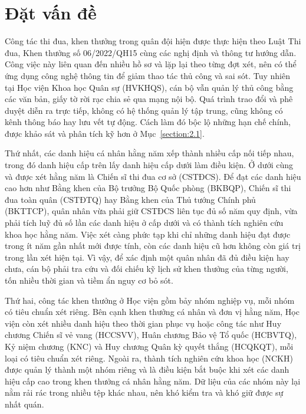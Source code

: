\documentclass[../DoAn.tex]{subfiles}
\begin{document}
\section{Đặt vấn đề}
\label{section:1.1}

Công tác thi đua, khen thưởng trong quân đội hiện được thực hiện theo Luật Thi đua, Khen thưởng số 06/2022/QH15 \cite{luat062022} cùng các nghị định và thông tư hướng dẫn.
Công việc này liên quan đến nhiều hồ sơ và lặp lại theo từng đợt xét, nên có thể ứng dụng công nghệ thông tin để giảm thao tác thủ công và sai sót. Tuy nhiên tại Học viện Khoa học Quân sự (HVKHQS), cán bộ vẫn quản lý thủ công bằng các văn bản, giấy tờ rời rạc chia sẻ qua mạng nội bộ.
Quá trình trao đổi và phê duyệt diễn ra trực tiếp, không có hệ thống quản lý tập trung, cũng không có kênh thông báo hay lưu vết tự động.
Cách làm đó bộc lộ những hạn chế chính, được khảo sát và phân tích kỹ hơn ở Mục~\ref{section:2.1}.

Thứ nhất, các danh hiệu cá nhân hằng năm xếp thành nhiều cấp nối tiếp nhau, trong đó danh hiệu cấp trên lấy danh hiệu cấp dưới làm điều kiện.
Ở dưới cùng và được xét hằng năm là Chiến sĩ thi đua cơ sở (CSTĐCS).
Để đạt các danh hiệu cao hơn như Bằng khen của Bộ trưởng Bộ Quốc phòng (BKBQP), Chiến sĩ thi đua toàn quân (CSTĐTQ) hay Bằng khen của Thủ tướng Chính phủ (BKTTCP), quân nhân vừa phải giữ CSTĐCS liên tục đủ số năm quy định, vừa phải tích luỹ đủ số lần các danh hiệu ở cấp dưới và có thành tích nghiên cứu khoa học hằng năm.
Việc xét càng phức tạp khi chỉ những danh hiệu đạt được trong ít năm gần nhất mới được tính, còn các danh hiệu cũ hơn không còn giá trị trong lần xét hiện tại.
Vì vậy, để xác định một quân nhân đã đủ điều kiện hay chưa, cán bộ phải tra cứu và đối chiếu kỹ lịch sử khen thưởng của từng người, tốn nhiều thời gian và tiềm ẩn nguy cơ bỏ sót.

Thứ hai, công tác khen thưởng ở Học viện gồm bảy nhóm nghiệp vụ, mỗi nhóm có tiêu chuẩn xét riêng.
Bên cạnh khen thưởng cá nhân và đơn vị hằng năm, Học viện còn xét nhiều danh hiệu theo thời gian phục vụ hoặc công tác như Huy chương Chiến sĩ vẻ vang (HCCSVV), Huân chương Bảo vệ Tổ quốc (HCBVTQ), Kỷ niệm chương (KNC) và Huy chương Quân kỳ quyết thắng (HCQKQT), mỗi loại có tiêu chuẩn xét riêng. Ngoài ra, thành tích nghiên cứu khoa học (NCKH) được quản lý thành một nhóm riêng và là điều kiện bắt buộc khi xét các danh hiệu cấp cao trong khen thưởng cá nhân hằng năm. Dữ liệu của các nhóm này lại nằm rải rác trong nhiều tệp khác nhau, nên khó kiểm tra và khó giữ được sự nhất quán.
\end{document}
